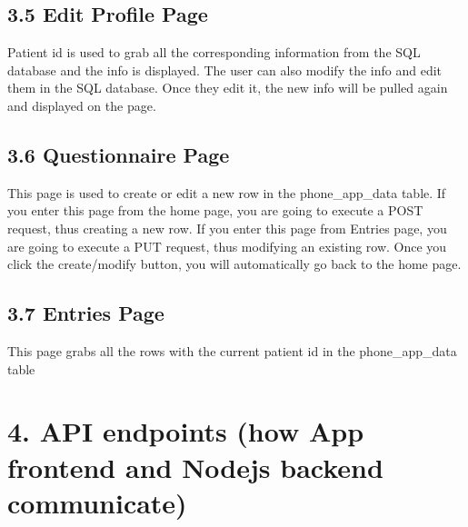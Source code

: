 \documentclass[]{book}
\begin{document}
\hypertarget{edit-profile-page}{%
\subsection{3.5 Edit Profile Page}\label{edit-profile-page}}

Patient id is used to grab all the corresponding information from the SQL database and the info is displayed. The user can also modify the info and edit them in the SQL database. Once they edit it, the new info will be pulled again and displayed on the page.

\hypertarget{questionnaire-page}{%
\subsection{3.6 Questionnaire Page}\label{questionnaire-page}}

This page is used to create or edit a new row in the phone\_app\_data table. If you enter this page from the home page, you are going to execute a POST request, thus creating a new row. If you enter this page from Entries page, you are going to execute a PUT request, thus modifying an existing row. Once you click the create/modify button, you will automatically go back to the home page.

\hypertarget{entries-page}{%
\subsection{3.7 Entries Page}\label{entries-page}}

This page grabs all the rows with the current patient id in the phone\_app\_data table

\hypertarget{api-endpoints-how-app-frontend-and-nodejs-backend-communicate}{%
\section{4. API endpoints (how App frontend and Nodejs backend communicate)}\label{api-endpoints-how-app-frontend-and-nodejs-backend-communicate}}
\end{document}
